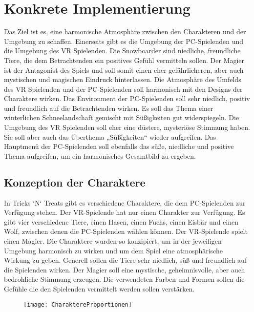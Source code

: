 \chapter{Konkrete Implementierung}
\label{cha:sa_Einleitung}
Das Ziel ist es, eine harmonische Atmosphäre zwischen den Charakteren und der Umgebung zu schaffen. Einerseits gibt es die Umgebung der PC-Spielenden und die Umgebung des VR Spielenden. Die Snowboarder sind niedliche, freundliche Tiere, die dem Betrachtenden ein positives Gefühl vermitteln sollen. Der Magier ist der Antagonist des Spiels und soll somit einen eher gefährlicheren, aber auch mystischen und magischen Eindruck hinterlassen. Die Atmosphäre des Umfelds des VR Spielenden und der PC-Spielenden soll harmonisch mit den Designs der Charaktere wirken. Das Environment der PC-Spielenden soll sehr niedlich, positiv und freundlich auf die Betrachtenden wirken. Es soll das Thema einer winterlichen Schneelandschaft gemischt mit Süßigkeiten gut widerspiegeln. Die Umgebung des VR Spielenden soll eher eine düstere, mysteriöse Stimmung haben. Sie soll aber auch das Überthema „Süßigkeiten“ wieder aufgreifen. Das Hauptmenü der PC-Spielenden soll ebenfalls das süße, niedliche und positive Thema aufgreifen, um ein harmonisches Gesamtbild zu ergeben.

\section{Konzeption der Charaktere}
In Tricks `N` Treats gibt es verschiedene Charaktere, die dem PC-Spielenden zur Verfügung stehen. Der VR-Spielende hat nur einen Charakter zur Verfügung. Es gibt vier verschiedene Tiere, einen Hasen, einen Fuchs, einen Eisbär und einen Wolf, zwischen denen die PC-Spielenden wählen können. Der VR-Spielende spielt einen Magier. Die Charaktere wurden so konzipiert, um in der jeweiligen Umgebung harmonisch zu wirken und um dem Spiel eine atmosphärische Wirkung zu geben. Generell sollen die Tiere sehr niedlich, süß und freundlich auf die Spielenden wirken. Der Magier soll eine mystische, geheimnisvolle, aber auch bedrohliche Stimmung erzeugen. Die verwendeten Farben und Formen sollen die Gefühle die den Spielenden vermittelt werden sollen verstärken.
 
 \begin{figure}[H]
 	\centering
 	\texttt{[image: CharaktereProportionen]}
 \end{figure}

